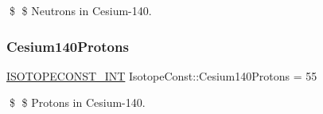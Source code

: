 \$ \$ Neutrons in Cesium-\/140. \mbox{\label{group___isotope_const-_cesium-_cs140_gad4a6e45243003d8409ecd5ebd33a7c4f}} 
\subsubsection{\texorpdfstring{Cesium140\+Protons}{Cesium140Protons}}
{\footnotesize\ttfamily \mbox{\hyperlink{group___isotope_const-_macros_ga5f18360b3e99483a35c32d789e62621c}{I\+S\+O\+T\+O\+P\+E\+C\+O\+N\+S\+T\+\_\+\+I\+NT}} Isotope\+Const\+::\+Cesium140\+Protons = 55}

\$ \$ Protons in Cesium-\/140. 